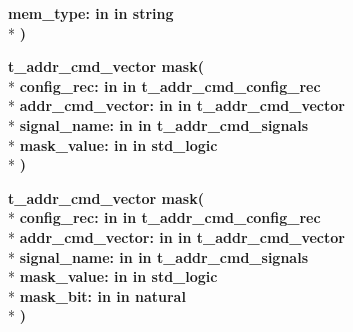 \begin{DoxyCompactItemize}
{\bfseries \textcolor{vhdlchar}{mem\+\_\+type\+: }\textcolor{stringliteral}{in }\textcolor{vhdlchar}{in string}}\\*
{\bfseries  )} 
\item 
{\bfseries {\bfseries \textcolor{vhdlchar}{t\+\_\+addr\+\_\+cmd\+\_\+vector}\textcolor{vhdlchar}{ }}} {\bf mask}{\bfseries  ( }\\*
{\bfseries \textcolor{vhdlchar}{config\+\_\+rec\+: }\textcolor{stringliteral}{in }\textcolor{vhdlchar}{in t\+\_\+addr\+\_\+cmd\+\_\+config\+\_\+rec}}\\*
{\bfseries \textcolor{vhdlchar}{addr\+\_\+cmd\+\_\+vector\+: }\textcolor{stringliteral}{in }\textcolor{vhdlchar}{in t\+\_\+addr\+\_\+cmd\+\_\+vector}}\\*
{\bfseries \textcolor{vhdlchar}{signal\+\_\+name\+: }\textcolor{stringliteral}{in }\textcolor{vhdlchar}{in t\+\_\+addr\+\_\+cmd\+\_\+signals}}\\*
{\bfseries \textcolor{vhdlchar}{mask\+\_\+value\+: }\textcolor{stringliteral}{in }\textcolor{vhdlchar}{in std\+\_\+logic}}\\*
{\bfseries  )} 
\item 
{\bfseries {\bfseries \textcolor{vhdlchar}{t\+\_\+addr\+\_\+cmd\+\_\+vector}\textcolor{vhdlchar}{ }}} {\bf mask}{\bfseries  ( }\\*
{\bfseries \textcolor{vhdlchar}{config\+\_\+rec\+: }\textcolor{stringliteral}{in }\textcolor{vhdlchar}{in t\+\_\+addr\+\_\+cmd\+\_\+config\+\_\+rec}}\\*
{\bfseries \textcolor{vhdlchar}{addr\+\_\+cmd\+\_\+vector\+: }\textcolor{stringliteral}{in }\textcolor{vhdlchar}{in t\+\_\+addr\+\_\+cmd\+\_\+vector}}\\*
{\bfseries \textcolor{vhdlchar}{signal\+\_\+name\+: }\textcolor{stringliteral}{in }\textcolor{vhdlchar}{in t\+\_\+addr\+\_\+cmd\+\_\+signals}}\\*
{\bfseries \textcolor{vhdlchar}{mask\+\_\+value\+: }\textcolor{stringliteral}{in }\textcolor{vhdlchar}{in std\+\_\+logic}}\\*
{\bfseries \textcolor{vhdlchar}{mask\+\_\+bit\+: }\textcolor{stringliteral}{in }\textcolor{vhdlchar}{in natural}}\\*
{\bfseries  )} 
\end{DoxyCompactItemize}
